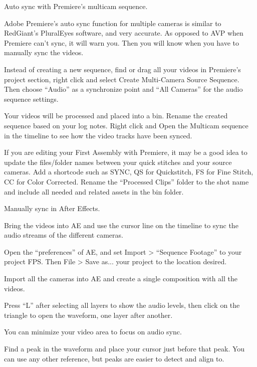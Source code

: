 \begin{fullwidth}
{\large Auto sync with Premiere’s multicam sequence. \par}

Adobe Premiere’s auto sync function for multiple cameras is similar to RedGiant’s PluralEyes software, and very accurate. As opposed to AVP when Premiere can’t sync, it will warn you. Then you will know when you have to manually sync the videos.

\clearpage
Instead of creating a new sequence, find or drag all your videos in Premiere’s project section, right click and select Create Multi-Camera Source Sequence. Then choose “Audio” as a synchronize point and “All Cameras” for the audio sequence settings.



Your videos will be processed and placed into a bin. Rename the created sequence based on your log notes. Right click and Open the Multicam sequence in the timeline to see how the video tracks have been synced.


If you are editing your First Assembly with Premiere, it may be a good idea to update the files/folder names between your quick stitches and your source cameras. Add a shortcode such as SYNC, QS for Quickstitch, FS for Fine Stitch, CC for Color Corrected. Rename the “Processed Clips” folder to the shot name and include all needed and related assets in the bin folder.

\clearpage
{\large Manually sync in After Effects. \par}

Bring the videos into AE and use the cursor line on the timeline to sync the audio streams of the different cameras.

Open the “preferences” of AE, and set Import > “Sequence Footage” to your project FPS. Then File > Save as... your project to the location desired.

Import all the cameras into AE and create a single composition with all the videos.

Press “L” after selecting all layers to show the audio levels, then click on the triangle to open the waveform, one layer after another. 


You can minimize your video area to focus on audio sync.

Find a peak in the waveform and place your cursor just before that peak. You can use any other reference, but peaks are easier to detect and align to.


\end{fullwidth}
